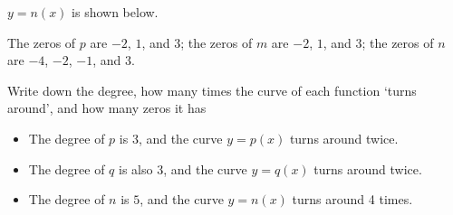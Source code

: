 \begin{exercises}
\begin{problem}
\begin{subproblem}
\begin{shortsolution}
			 $y=n(x)$ is shown below.


			 The zeros of $p$ are $-2$, $1$, and $3$; the zeros of $m$ are $-2$, $1$, and $3$; the zeros of $n$ are
			 $-4$, $-2$, $-1$, and $3$.
		 \end{shortsolution}
	 \end{subproblem}
	 \begin{subproblem}
		 Write down the degree, how many times the curve of each function `turns around',
		 and how many zeros it has
		 \begin{shortsolution}
			 \begin{itemize}
				 \item The degree of $p$ is 3, and the curve $y=p(x)$ turns around twice.
				 \item The degree of $q$ is also 3, and the curve $y=q(x)$ turns around twice.
				 \item The degree of $n$ is $5$, and the curve $y=n(x)$ turns around 4 times.
			 \end{itemize}
		 \end{shortsolution}
	 \end{subproblem}
	 \end{problem}


\end{exercises}
